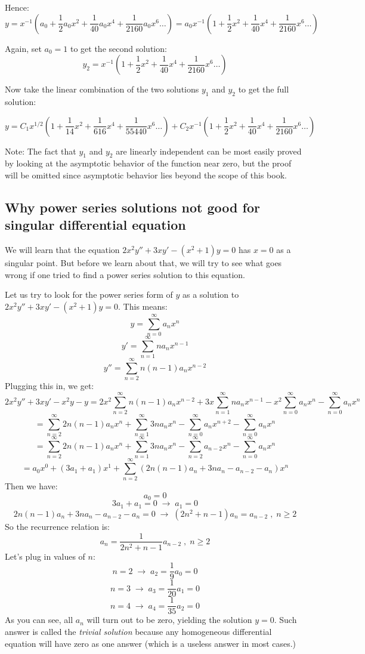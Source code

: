 \documentclass[12pt]{report}
\begin{document}
Hence:
$$y = x^{-1} \left( a_0 + \frac{1}{2} a_{0} x^2 + \frac{1}{40} a_{0} x^4 + \frac{1}{2160} a_{0} x^6 \dots \right) = a_0 x^{-1} \left( 1 + \frac{1}{2} x^2 + \frac{1}{40} x^4 + \frac{1}{2160} x^6 \dots \right)$$

Again, set $a_0=1$ to get the second solution:
$$y_2 = x^{-1} \left( 1 + \frac{1}{2} x^2 + \frac{1}{40} x^4 + \frac{1}{2160} x^6 \dots \right) $$

Now take the linear combination of the two solutions $y_1$ and $y_2$ to get the full solution:

$$y = C_1 x^{1/2}  \left( 1+ \frac{1}{14}  x^2 + \frac{1}{616} x^4 + \frac{1}{55440} x^6 \dots \right) + C_2 x^{-1} \left( 1 + \frac{1}{2} x^2 + \frac{1}{40} x^4 + \frac{1}{2160} x^6 \dots \right) $$

Note: The fact that $y_1$ and $y_2$ are linearly independent can be most easily proved by looking at the asymptotic behavior of the function near zero, but the proof will be omitted since asymptotic behavior lies beyond the scope of this book. 

\subsection*{Why power series solutions not good for singular differential equation }
We will learn that the equation $2x^2 y'' + 3xy' - (x^2 +1)y =0$ has $x=0$ as a singular point. But before we learn about that, we will try to see what goes wrong if one tried to find a power series solution to this equation.

Let us try to look for the power series form of $y$ as a solution to $2x^2 y'' + 3xy' - (x^2 +1)y =0$. This means:
$$y = \sum_{n=0}^{\infty} a_n x^{n} $$
$$y' = \sum_{n=1}^{\infty} n a_n x^{n-1} $$
$$y'' = \sum_{n=2}^{\infty} n (n-1) a_n x^{n-2} $$
Plugging this in, we get:
$$2x^2 y'' + 3xy' - x^2y- y =2x^2 \sum_{n=2}^{\infty} n (n-1) a_n x^{n-2} + 3x\sum_{n=1}^{\infty} n a_n x^{n-1} - x^2\sum_{n=0}^{\infty} a_n x^{n} -\sum_{n=0}^{\infty} a_n x^{n}$$
$$= \sum_{n=2}^{\infty} 2 n (n-1) a_n x^{n} + \sum_{n=1}^{\infty} 3n a_n x^{n} - \sum_{n=0}^{\infty} a_n x^{n+2} -\sum_{n=0}^{\infty} a_n x^{n}$$
$$= \sum_{n=2}^{\infty} 2 n (n-1) a_n x^{n} + \sum_{n=1}^{\infty} 3n a_n x^{n} - \sum_{n=2}^{\infty} a_{n-2} x^{n} -\sum_{n=0}^{\infty} a_n x^{n}$$
$$ = a_0 x^0 + (3a_1 +a_1) x^1 + \sum_{n=2}^{\infty} \left( 2 n (n-1) a_n + 3n a_n - a_{n-2} -a_n \right) x^n $$
Then we have:
$$a_0 =0 $$
$$3a_1 +a_1=0 \; \rightarrow \; a_1 =0 $$
$$ 2 n (n-1) a_n + 3n a_n - a_{n-2} -a_n = 0 \; \rightarrow \; \left( 2n^2 +n -1 \right)a_n = a_{n-2} \; , \; n \geq 2 $$
So the recurrence relation is:
$$a_n = \frac{1}{2n^2 +n -1} a_{n-2}\;, \; n \geq 2$$
Let's plug in values of $n$:
$$n=2 \; \rightarrow \; a_2 = \frac{1}{9} a_{0} =0 $$
$$n=3 \; \rightarrow \; a_3 = \frac{1}{20} a_{1} =0 $$
$$n=4 \; \rightarrow \; a_4 = \frac{1}{35} a_{2} =0 $$
As you can see, all $a_n$ will turn out to be zero, yielding the solution $y=0$. Such answer is called the \textit{trivial solution} because any homogeneous differential equation will have zero as one answer (which is a useless answer in most cases.)
\end{document}
